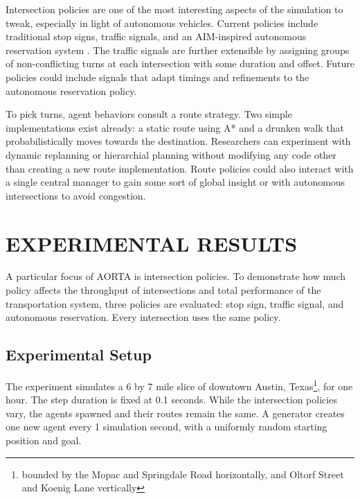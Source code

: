 \documentclass[letterpaper, 10 pt, conference]{ieeeconf}  %
\begin{document}
Intersection policies are one of the most interesting aspects of the simulation
to tweak, especially in light of autonomous vehicles. Current policies include
traditional stop signs, traffic signals, and an AIM-inspired autonomous
reservation system \cite{JAIR08-dresner}. The traffic signals are further
extensible by assigning groups of non-conflicting turns at each intersection
with some duration and offset. Future policies could include signals that adapt
timings and refinements to the autonomous reservation policy.

To pick turns, agent behaviors consult a route strategy. Two simple
implementations exist already: a static route using A* \cite{astar} and a
drunken walk that probabilistically moves towards the destination. Researchers
can experiment with dynamic replanning or hierarchial planning
\cite{Botea04nearoptima} without modifying any code other than creating a new
route implementation. Route policies could also interact with a single central
manager to gain some sort of global insight or with autonomous intersections to
avoid congestion.


\section{EXPERIMENTAL RESULTS}
\label{sec:results}

A particular focus of AORTA is intersection policies. To demonstrate how much
policy affects the throughput of intersections and total performance of the
transportation system, three policies are evaluated: stop sign, traffic signal,
and autonomous reservation. Every intersection uses the same policy.

\subsection{Experimental Setup}

The experiment simulates a 6 by 7 mile slice of downtown Austin,
Texas\footnote{bounded by the Mopac and Springdale Road horizontally, and Oltorf
Street and Koenig Lane vertically}, for one hour. The step duration is fixed at
0.1 seconds. While the intersection policies vary, the agents spawned and their
routes remain the same. A generator creates one new agent every 1 simulation
second, with a uniformly random starting position and goal.
\end{document}
